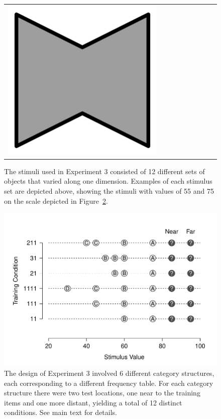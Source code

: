 \documentclass[doc]{apa6}
\newcommand{\stimulusscale}{.1}
\begin{document}
\begin{figure}[p]
\begin{center}
\begin{tabular}{c|cccccccc}
\includegraphics[scale=\stimulusscale]{./set12stim75.png} \\
\end{tabular}
\caption{The stimuli used in Experiment 3 consisted of 12 different sets of objects that varied along one dimension. Examples of each stimulus set are depicted above, showing the stimuli with values of 55 and 75 on the scale depicted in Figure~\protect\ref{fig:design3}. }
\label{fig:stim3}
\end{center}
\end{figure}

\begin{figure}[p]
\begin{center}
\includegraphics[scale=.55]{design3.pdf}
\caption{The design of Experiment 3 involved 6 different category structures, each corresponding to a different frequency table. For each category structure there were two test locations, one near to the training items and one more distant, yielding a total of 12 distinct conditions. See main text for details.}
\label{fig:design3}
\end{center}
\end{figure}
\end{document}
